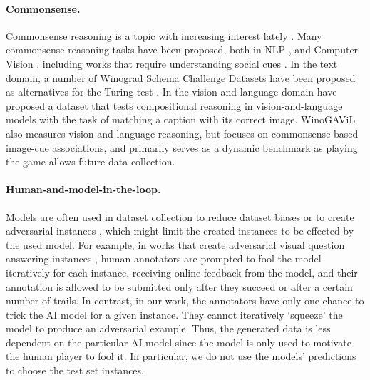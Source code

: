 \documentclass{article}
\newcommand{\ouracronym}[0]{WinoGAViL}
\begin{document}
\paragraph{Commonsense.} Commonsense reasoning is a topic with increasing interest lately \cite{choi2022curious}. Many commonsense reasoning tasks have been proposed, both in NLP \cite{saha2021explagraphs,zellers2018swag,zellers2019hellaswag,sap2019atomic,bisk2020piqa,forbes2019neural}, and Computer Vision \cite{fang2020video2commonsense,vedantam2015learning}, including works that require understanding social cues \cite{lei2020more,zellers2019recognition}. In the text domain, a number of Winograd Schema Challenge Datasets have been proposed as alternatives for the Turing test \cite{levesque2012winograd,sakaguchi2020winogrande,kocijan2020review,rudinger2018gender,emelin-sennrich-2021-wino}. In the vision-and-language domain \citet{thrush2022winoground} have proposed a dataset that tests compositional reasoning in vision-and-language models with the task of matching a caption with its correct image. \ouracronym{} also measures vision-and-language reasoning, but focuses on commonsense-based image-cue associations, and primarily serves as a dynamic benchmark as playing the game allows future data collection.

\paragraph{Human-and-model-in-the-loop.} Models are often used in dataset collection to reduce dataset biases or to create adversarial instances \cite{zellers2018swag,zellers2019hellaswag,le2020adversarial,kaushik2019learning,nie2019adversarial}, which might limit the created instances to be effected by the used model. For example, in works that create adversarial visual question answering instances \cite{li2021adversarial,sheng2021human}, human annotators are prompted to fool the model iteratively for each instance, receiving online feedback from the model, and their annotation is allowed to be submitted only after they succeed or after a certain number of trails. In contrast, in our work, the annotators have only one chance to trick the AI model for a given instance. They cannot iteratively `squeeze' the model to produce an adversarial example. Thus, the generated data is less dependent on the particular AI model since the model is only used to motivate the human player to fool it. In particular, we do not use the models' predictions to choose the test set instances. 
\end{document}
